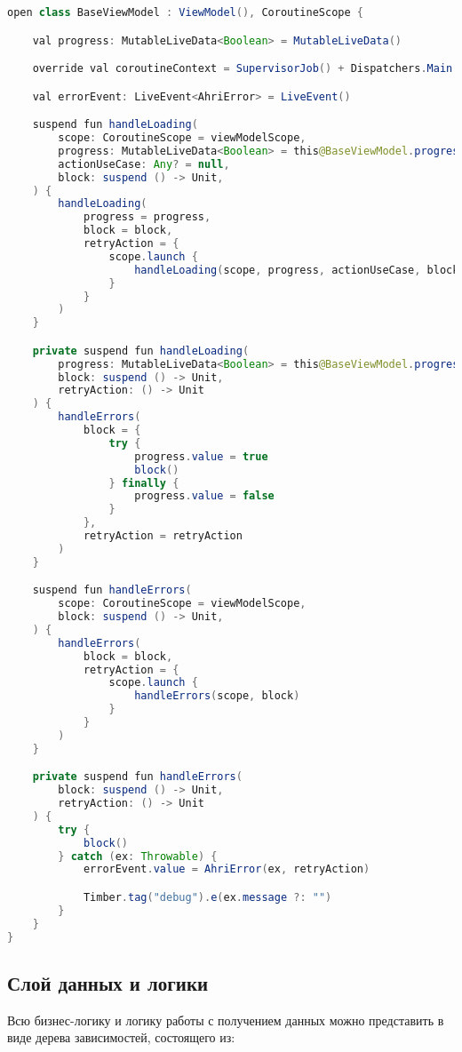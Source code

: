 \begin{lstlisting}[language=Java,label={lst:baseViewModel},caption={Компонент BaseViewModel}]
open class BaseViewModel : ViewModel(), CoroutineScope {

    val progress: MutableLiveData<Boolean> = MutableLiveData()

    override val coroutineContext = SupervisorJob() + Dispatchers.Main

    val errorEvent: LiveEvent<AhriError> = LiveEvent()

    suspend fun handleLoading(
        scope: CoroutineScope = viewModelScope,
        progress: MutableLiveData<Boolean> = this@BaseViewModel.progress,
        actionUseCase: Any? = null,
        block: suspend () -> Unit,
    ) {
        handleLoading(
            progress = progress,
            block = block,
            retryAction = {
                scope.launch {
                    handleLoading(scope, progress, actionUseCase, block)
                }
            }
        )
    }

    private suspend fun handleLoading(
        progress: MutableLiveData<Boolean> = this@BaseViewModel.progress,
        block: suspend () -> Unit,
        retryAction: () -> Unit
    ) {
        handleErrors(
            block = {
                try {
                    progress.value = true
                    block()
                } finally {
                    progress.value = false
                }
            },
            retryAction = retryAction
        )
    }

    suspend fun handleErrors(
        scope: CoroutineScope = viewModelScope,
        block: suspend () -> Unit,
    ) {
        handleErrors(
            block = block,
            retryAction = {
                scope.launch {
                    handleErrors(scope, block)
                }
            }
        )
    }

    private suspend fun handleErrors(
        block: suspend () -> Unit,
        retryAction: () -> Unit
    ) {
        try {
            block()
        } catch (ex: Throwable) {
            errorEvent.value = AhriError(ex, retryAction)

            Timber.tag("debug").e(ex.message ?: "")
        }
    }
}
\end{lstlisting}

\subsection{Слой данных и логики}
Всю бизнес-логику и логику работы с получением данных можно представить в виде дерева зависимостей, состоящего из:

